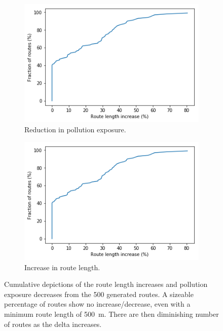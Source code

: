\documentclass[11pt]{report}
\begin{document}
\begin{figure}[!tb]
    \centering
    \begin{minipage}{1\linewidth}
            \begin{subfigure}[t]{.5\linewidth}
                \includegraphics[width=\textwidth]{images/pollution_reductions}
                \caption{Reduction in pollution exposure.}
                \label{fig:pollution_reductions}
            \end{subfigure}
            \begin{subfigure}[t]{.5\linewidth}
            	\includegraphics[width=\textwidth]{images/length_increases}
            	\caption{Increase in route length.}
            	\label{fig:length_increases}
	   \end{subfigure}
    \end{minipage}
    \caption[Changes in exposure and route length.]{Cumulative depictions of the route length increases and pollution exposure decreases from the 500 generated routes. A sizeable percentage of routes show no increase/decrease, even with a minimum route length of 500~m. There are then diminishing number of routes as the delta increases.}
    \label{fig:cumulatives}
\end{figure}
\end{document}
